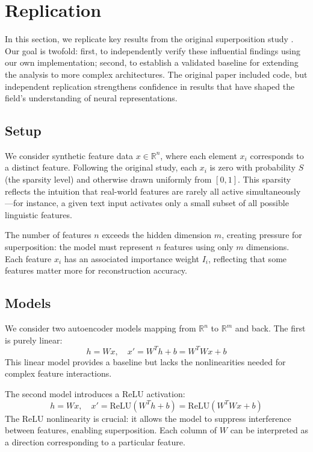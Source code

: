 \section{Replication}

In this section, we replicate key results from the original superposition study \citep{elhage2022toy}. Our goal is twofold: first, to independently verify these influential findings using our own implementation; second, to establish a validated baseline for extending the analysis to more complex architectures. The original paper included code, but independent replication strengthens confidence in results that have shaped the field's understanding of neural representations.

\subsection{Setup}

We consider synthetic feature data $x \in \mathbb{R}^n$, where each element $x_i$ corresponds to a distinct feature. Following the original study, each $x_i$ is zero with probability $S$ (the sparsity level) and otherwise drawn uniformly from $[0, 1]$. This sparsity reflects the intuition that real-world features are rarely all active simultaneously---for instance, a given text input activates only a small subset of all possible linguistic features.

The number of features $n$ exceeds the hidden dimension $m$, creating pressure for superposition: the model must represent $n$ features using only $m$ dimensions. Each feature $x_i$ has an associated importance weight $I_i$, reflecting that some features matter more for reconstruction accuracy.

\subsection{Models}

We consider two autoencoder models mapping from $\mathbb{R}^n$ to $\mathbb{R}^m$ and back. The first is purely linear:
\begin{equation}
h = Wx, \quad x' = W^T h + b = W^T W x + b
\label{eq:linear_model}
\end{equation}
This linear model provides a baseline but lacks the nonlinearities needed for complex feature interactions.

The second model introduces a ReLU activation:
\begin{equation}
h = Wx, \quad x' = \text{ReLU}(W^T h + b) = \text{ReLU}(W^T W x + b)
\label{eq:relu_model}
\end{equation}
The ReLU nonlinearity is crucial: it allows the model to suppress interference between features, enabling superposition. Each column of $W$ can be interpreted as a direction corresponding to a particular feature.

